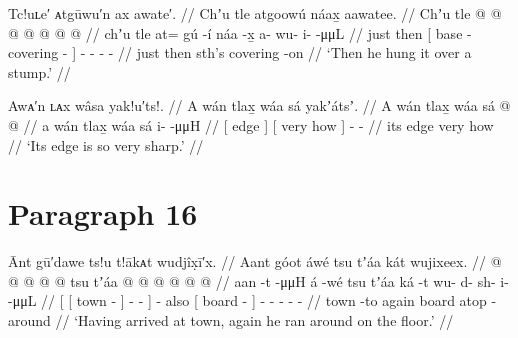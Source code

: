 
\ex\label{ex:91-184-hung-on-stump}%
%
\begingl
	\glpreamble	Tc!uʟe′ ᴀtgūwu′n ax awate′. //
	\glpreamble	Chʼu tle atgoowú náax̱ aawatee. //
	\gla	Chʼu tle {}  @ {} @ {}  @ {} {}
		 @ {} @ {} @ {} @ {} //
	\glb	chʼu tle {} at= gú -í náa -x̱ {}
		a- wu- i-  -μμL //
	\glc	just then {}[  base - covering - {}]
		- - -  - //
	\gld	just then {} sth’s  {} covering -on {}
		 {} {} {} {} //
	\glft	‘Then he hung it over a stump.’
		//
\endgl
\xe

\ex\label{ex:91-185-so-sharp}%
%
\begingl
	\glpreamble	Awᴀ′n ʟᴀx wâsa yak!u′ts!. //
	\glpreamble	A wán tlax̱ wáa sá yakʼátsʼ. //
	\gla	{} A wán {} {} tlax̱ wáa sá {}
		 @ {} @ {} //
	\glb	{} a wán {} {} tlax̱ wáa sá {}
		i-  -μμH //
	\glc	{}[  edge {}] {}[ very how  {}]
		-  - //
	\gld	{} its edge {} {} very how  {}
		 {} {} //
	\glft	‘Its edge is so very sharp.’
		//
\endgl
\xe

\section{Paragraph 16}\label{sec:91-para-16}

\ex\label{ex:91-186-arrive-town-run-around-on-floor}%
%
\begingl
	\glpreamble	Ānt gū′dawe ts!u t!ākᴀt wudjîx̣ī′x. //
	\glpreamble	Aant góot áwé tsu tʼáa kát wujixeex. //
	\gla	{} {}  @ {} {}  @ {} @ {} @ {} {}
		 @ {}
		tsu {} tʼáa  @ {} {}
		 @ {} @ {} @ {} @ {} @ {} //
	\glb	{} {} aan -t {} {}  -μμH {} {}
		á -wé
		tsu {} tʼáa ká -t {}
		wu- d- sh- i-  -μμL //
	\glc	{}[ {}[ town - {}]
			-  - \· {}]
		 -
		also {}[ board  - {}]
		- - - -  - //
	\gld	{} {} town -to {}  {} {} {} {}
		 {}
		again {} board atop -around {}
		 {} {} {} {} {} //
	\glft	‘Having arrived at town, again he ran around on the floor.’
		//
\endgl
\xe

